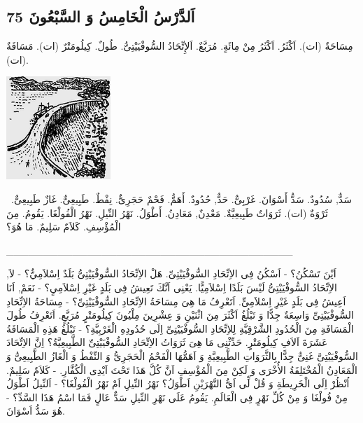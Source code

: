\documentclass[a5paper]{article}
\begin{document}
\subsection[اَلدَّرْسُ الْخَامِسُ وَ السَّبْعُونَ 75]{اَلدَّرْسُ الْخَامِسُ وَ السَّبْعُونَ 75}
مِسَاحَةٌ (ات). اَكْثَرُ. اَكْثَرُ مِنْ مِائَةٍ. مُرَبَّعٌ. \newline
اَلإِتِّحَادُ السُّوفْيَيْتِىُّ. طُولٌ. كِيلُومَتْرٌ (ات). مَسَافَةٌ (ات). 

 \includegraphics[width=1.552in,height=1.5311in]{images/MuhammadBagauddinprettified-img225.png} 

\ سَدٌّ, سُدُودٌ. سَدُّ أَسْوَانَ. غَرْبِىٌّ. حَدٌّ, حُدُودٌ. أَهَمُّ.\newline
فَحْمٌ حَجَرِىٌّ. نِفْطٌ. طَبِيعِىٌّ. غَازٌ طَبِيعِىٌّ. ثَرْوَةٌ (ات). ثَرَوَاتٌ طَبِيعِيَّةٌ. مَعْدِنٌ, مَعَادِنُ. أَطْوَلُ. نَهْرُ النِّيلِ. نَهْرُ الْفُولْغَا. يَقُومُ. مِنَ الْمُؤْسِفِ. كَلاَمٌ سَلِيمٌ. مَا هُوَ؟

\_\_\_\_\_\_\_\_\_\_\_\_\_\_\_\_\_\_\_\_\_\_\_\_\_\_\_\_\_\_\_\_\_\_\_\_\_\_\_

اَيْنَ تَسْكُنُ؟ - اَسْكُنُ فِى الاِتِّحَادِ السُّوفْيَيْتِىِّ. هَلْ الاِتِّحَادُ السُّوفْيَيْتِىُّ بَلَدٌ اِسْلاَمِيٌّ؟ - لاَ, الاِتِّحَادُ السُّوفْيَيْتِىُّ لَيْسَ بَلَدًا اِسْلاَمِيًّا. يَعْنِى اَنَّكَ تَعِيشُ فِى بَلَدٍ غَيْرِ اِسْلاَمِىٍ؟ - نَعَمْ, اَنَا اَعِيشُ فِى بَلَدٍ غَيْرِ اِسْلاَمِىٍّ. اَتَعْرِفُ مَا هِىَ مِسَاحَةُ الاِتِّحَادِ السُّوفْيَيْتِىِّ؟ - مِسَاحَةُ الاِتِّحَادِ السُّوفْيَيْتِىِّ وَاسِعَةٌ جِدًّا وَ تَبْلُغُ اَكْثَرَ مِنَ اثْنَيْنِ وَ عِشْرِينَ مِلْيُونَ كِيلُومَتْرٍ مُرَبَّعٍ. اَتَعْرِفُ طُولَ الْمَسَافَةِ مِنَ الْحُدُودِ الشَّرْقِيَّةِ لِلاِتِّحَادِ السُّوفْيَيْتِىِّ اِلَى حُدُودِهِ الْغَرْبِيَّةِ؟ - تَبْلُغُ هَذِهِ الْمَسَافَةُ عَشَرَةَ اَلاَفِ كِيلُومَتْرٍ. حَدِّثْنِى مَا هِىَ ثَرَوَاتُ الاِتِّحَادِ السُّوفْيَيْتِىِّ الطَّبِيعِيَّةُ؟ اِنَّ الاِتِّحَادَ السُّوفْيَيْتِىَّ غَنِىٌّ جِدًّا بِالثَّرَوَاتِ الطَّبِيعِيَّةِ وَ اَهَمُّهَا الْفَحْمُ الْحَجَرِىُّ وَ النِّفْطُ وَ الْغَازُ الطَّبِيعِىُّ وَ الْمَعَادِنُ الْمُخْتَلِفَةُ الأُخْرَى وَ لَكِنْ مِنَ الْمُؤْسِفِ اَنَّ كُلَّ هَذَا تَحْتَ اَيْدِى الْكُفَّارِ. - كَلاَمٌ سَلِيمٌ. اُنْظُرْ اِلَى الْخَرِيطَةِ وَ قُلْ لِّى اَىُّ النَّهْرَيْنِ اَطْوَلُ؟ نَهْرُ النِّيلِ اَمْ نَهْرُ الْفُولْغَا؟ - اَلنِّيلُ اَطْوَلُ مِنْ فُولْغَا وَ مِنْ كُلِّ نَهْرٍ فِى الْعَالَمِ. يَقُومُ عَلَى نَهْرِ النِّيلِ سَدٌّ عَالٍ فَمَا اسْمُ هَذَا السَّدِّ؟ - هُوَ سَدُّ اَسْوَانَ.
\end{document}
